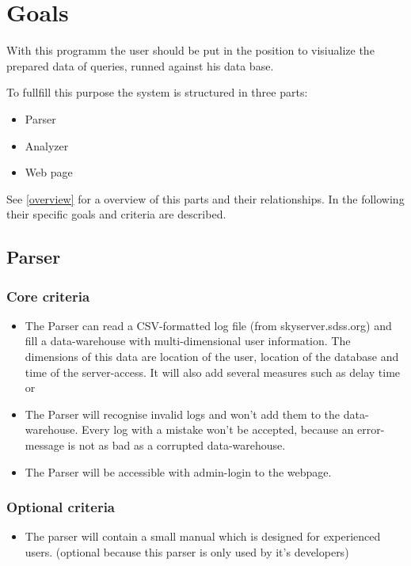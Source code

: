 \section{Goals}


With this programm the user should be put in the position 
to visiualize the prepared data of queries, runned against his data base.


To fullfill this purpose the system is structured in three parts:
\begin{itemize}
  \item Parser
  \item Analyzer
  \item Web page
\end{itemize}
See \ref{overview} for a overview of this parts and their relationships.
In the following their specific goals and criteria are described.

\subsection{Parser}

\subsubsection{Core criteria} %
\begin{itemize}
\item The Parser can read a CSV-formatted log file (from skyserver.sdss.org)
 and fill a data-warehouse with multi-dimensional user information.
 The dimensions of this data are location of the user, location of the 
 database and time of the server-access. It will also add several measures such as delay time or  
\item The Parser will recognise invalid logs and won't add them to the data-warehouse.
 Every log with a mistake won't be accepted, because an error-message is not 
 as bad as a corrupted data-warehouse. 
\item The Parser will be accessible with admin-login to the webpage.
\end{itemize} 

\subsubsection{Optional criteria}
\begin{itemize}
\item The parser will contain a small manual which is designed for experienced users. (optional because this parser is
only used by it's developers)
\end{itemize}

